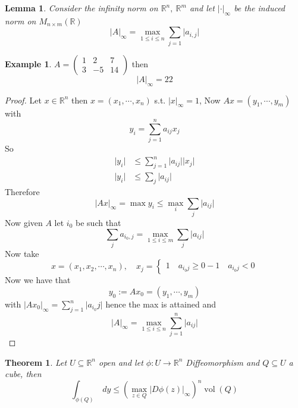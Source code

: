 \documentclass[11pt,a4paper]{article}
\theoremstyle{definition}
\newtheorem{example}[definition]{Example}
\theoremstyle{plain}
\newtheorem{theorem}[definition]{Theorem}
\newtheorem{lemma}[definition]{Lemma}
\theoremstyle{remark}
\newcommand{\R}{\mathbb{R}}
\newcommand{\abs}[1]{\lvert #1 \rvert}
\newcommand{\vol}{\operatorname{vol}}
\begin{document}
\begin{lemma}
    Consider the infinity norm on $\R^n, \ \R^m$ and let 
    $\abs{\cdot}_\infty$ be the induced norm on $M_{n \times m} (\R)$ 
    $$\abs{A}_\infty = \max_{1 \le i \le n} \sum_{j=1} \abs{a_{i,j}}$$
\end{lemma}

\begin{example}
    $A = \begin{pmatrix}
        1 & 2 & 7 \\
        3 & -5 & 14
    \end{pmatrix}$ then 
    $$\abs{A}_\infty= 22$$
\end{example}

\begin{proof}
    Let $x \in \R^n$ then $x = (x_1, \cdots, x_n)$ s.t. $\abs{x}_\infty = 1$, 
    Now $Ax = (y_1, \cdots, y_m)$ with 
    $$y_i = \sum_{j=1}^n a_{ij} x_j$$
    So 
    \begin{align*}
        \abs{y_i} &\le \sum_{j=1}^n \abs{a_{ij}} \abs{x_j} \\
        \abs{y_i} &\le \sum_{j} \abs{a_{ij}}  
    \end{align*}
    Therefore 
    $$\abs{Ax}_\infty = \max {y_i} \le \max_i \sum_{j} \abs{a_{ij}}$$
    Now given $A$ let $i_0$ be such that 
    $$\sum_j a_{i_0,j} = \max_{1 \le i \le m} \sum_j \abs{a_{ij}}$$
    Now take 
    $$x = (x_1, x_2, \cdots, x_n), \quad x_j =  \begin{cases}
        1 \quad a_{i_0j} \ge 0 
        -1 \quad a_{i_0j} < 0
    \end{cases}$$
    Now we have that 
    $$y_0 := A x_0 = (y_1, \cdots, y_m)$$ 
    with $\abs{A x_0}_\infty = \sum_{j=1}^n \abs{a_{i_0}j}$ hence the max is attained and 
    $$\abs{A}_\infty = \max_{1 \le i \le n} \sum_{j=1}^n \abs{a_{ij}}$$  
\end{proof}

\begin{theorem}
    Let $U \subseteq \R^n$ open and let $\phi \colon U \to \R^n$ Diffeomorphism and 
    $Q \subseteq U$ a cube, then 
    $$\int_{\phi(Q)} \ dy \le (\max_{z \in Q} \abs{D\phi(z)}_\infty)^n \vol (Q)$$
\end{theorem}
\end{document}
